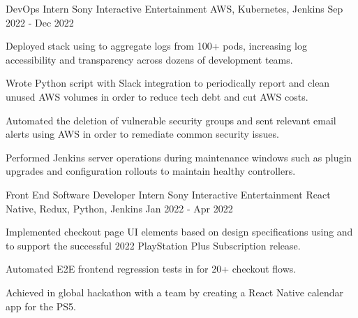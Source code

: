 

\begin{cventries}

  \cventry
    {DevOps Intern} %
    {Sony Interactive Entertainment} %
    {AWS, Kubernetes, Jenkins} %
    {Sep 2022 - Dec 2022} %
    {
      \begin{cvitems} %
        \item {Deployed  stack using  to aggregate logs from 100+  pods, increasing log accessibility and transparency across dozens of development teams.}
        \item {Wrote Python script with Slack integration to periodically report and clean unused AWS volumes in order to reduce tech debt and cut AWS costs.}
        \item {Automated the deletion of vulnerable security groups and sent relevant email alerts using AWS  in order to remediate common security issues.}
        \item {Performed  Jenkins server operations during maintenance windows such as plugin upgrades and configuration rollouts to maintain healthy controllers.}
      \end{cvitems}
    }

  \cventry
    {Front End Software Developer Intern} %
    {Sony Interactive Entertainment} %
    {React Native, Redux, Python, Jenkins} %
    {Jan 2022 - Apr 2022} %
    {
      \begin{cvitems} %
        \item {Implemented checkout page UI elements based on design specifications using  and  to support the successful 2022 PlayStation Plus Subscription release.}
        \item {Automated E2E frontend regression tests in  for 20+ checkout flows.} 
        \item {Achieved  in global hackathon with a team by creating a React Native calendar app for the PS5.}
      \end{cvitems}
    }


\end{cventries}
